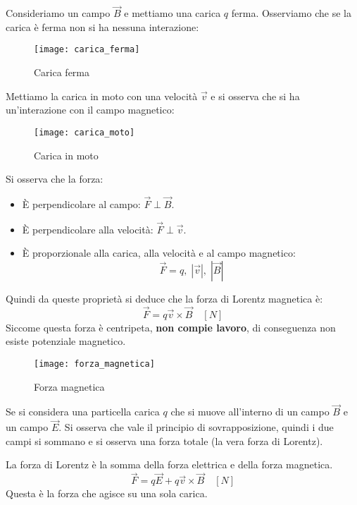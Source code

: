 \documentclass[a4paper]{article}
\begin{document}
Consideriamo un campo \( \vec{B} \) e mettiamo una carica \( q \) ferma. Osserviamo che
se la carica è ferma non si ha nessuna interazione:
\begin{figure}[H]
  \centering
  \texttt{[image: carica\_ferma]}
  \caption{Carica ferma}
\end{figure}
\noindent
Mettiamo la carica in moto con una velocità \( \vec{v} \) e si osserva che si
ha un'interazione con il campo magnetico:
\begin{figure}[H]
  \centering
  \texttt{[image: carica\_moto]}
  \caption{Carica in moto}
\end{figure}
\noindent
Si osserva che la forza:
\begin{itemize}
  \item È perpendicolare al campo: \( \vec{F} \perp \vec{B} \).
  \item È perpendicolare alla velocità: \( \vec{F} \perp \vec{v} \).
  \item È proporzionale alla carica, alla velocità e al campo magnetico:
    \[
      \vec{F} = q,\; |\vec{v}|,\; |\vec{B}|
    \]
\end{itemize}
Quindi da queste proprietà si deduce che la forza di Lorentz magnetica è:
\[
  \vec{F} = q \vec{v} \times \vec{B} \quad \left[ N \right]
\] 
Siccome questa forza è centripeta, \textbf{non compie lavoro}, di conseguenza non esiste
potenziale magnetico.
\begin{figure}[H]
  \centering
  \texttt{[image: forza\_magnetica]}
  \caption{Forza magnetica}
\end{figure}

\vspace{1em}
\noindent
Se si considera una particella carica \( q \) che si muove all'interno di un campo 
\( \vec{B} \) e un campo \( \vec{E} \). Si osserva che vale il principio di sovrapposizione,
quindi i due campi si sommano e si osserva una forza totale (la vera forza di Lorentz).

\vspace{1em}
\noindent
\begin{definition}
  La forza di Lorentz è la somma della forza elettrica e della forza magnetica.
  \[
    \vec{F} = q \vec{E} + q \vec{v} \times \vec{B} \quad \left[ N \right]
  \] 
  Questa è la forza che agisce su una sola carica.
\end{definition}
\end{document}

